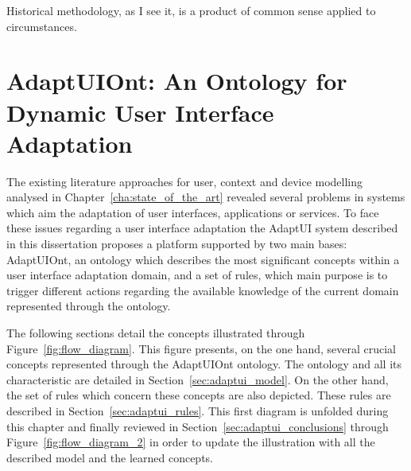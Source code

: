 
\begin{savequote}[50mm]
Historical methodology, as I see it, is a product of common sense applied to circumstances. 
\end{savequote}


\chapter{AdaptUIOnt: An Ontology for Dynamic User Interface Adaptation}
\label{cha:ontology_model}

\ifpdf
    \graphicspath{{3_ontology_model/figures/PNG/}{3_ontology_model/figures/PDF/}{3_ontology_model/figures/}}
\else
    \graphicspath{{3_ontology_model/figures/EPS/}{3_ontology_model/figures/}}
\fi

The existing literature approaches for user, context and device modelling
analysed in Chapter~\ref{cha:state_of_the_art} revealed several problems in
systems which aim the adaptation of user interfaces, applications or services.
To face these issues regarding a user interface adaptation the AdaptUI system
described in this dissertation proposes a platform supported by two main bases:
AdaptUIOnt, an ontology which describes the most significant concepts within a
user interface adaptation domain, and a set of rules, which main purpose is
to trigger different actions regarding the available knowledge of the current
domain represented through the ontology.

The following sections detail the concepts illustrated through Figure~\ref{fig:flow_diagram}.
This figure presents, on the one hand, several crucial concepts represented
through the AdaptUIOnt ontology. The ontology and all its characteristic are
detailed in Section~\ref{sec:adaptui_model}. On the other hand, the set of rules
which concern these concepts are also depicted. These rules are described in
Section~\ref{sec:adaptui_rules}. This first diagram is unfolded during this
chapter and finally reviewed in Section~\ref{sec:adaptui_conclusions} through
Figure~\ref{fig:flow_diagram_2} in order to update the illustration with all the
described model and the learned concepts.

